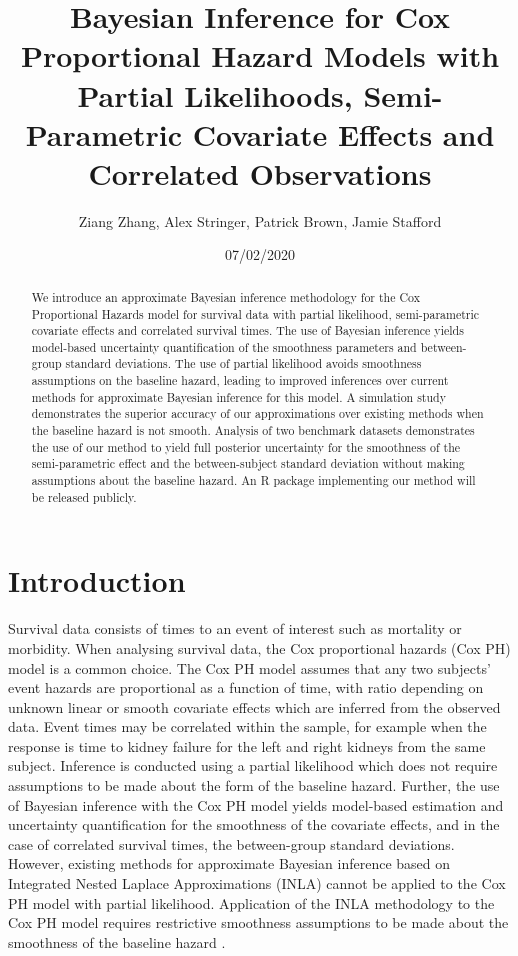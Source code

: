 \documentclass[]{article}
\title{{\myfont Bayesian Inference for Cox Proportional Hazard Models with Partial Likelihoods, Semi-Parametric Covariate Effects and Correlated Observations}}
\date{07/02/2020}
\author{Ziang Zhang, Alex Stringer, Patrick Brown, Jamie Stafford}
\begin{document}
	
\maketitle

\begin{abstract}
We introduce an approximate Bayesian inference methodology for the Cox Proportional Hazards model for survival data with partial likelihood, semi-parametric covariate effects and correlated survival times. The use of Bayesian inference yields model-based uncertainty quantification of the smoothness parameters and between-group standard deviations. The use of partial likelihood avoids smoothness assumptions on the baseline hazard, leading to improved inferences over current methods for approximate Bayesian inference for this model. A simulation study demonstrates the superior accuracy of our approximations over existing methods when the baseline hazard is not smooth. Analysis of two benchmark datasets demonstrates the use of our method to yield full posterior uncertainty for the smoothness of the semi-parametric effect and the between-subject standard deviation without making assumptions about the baseline hazard. An R package implementing our method will be released publicly.
\end{abstract}


\section{Introduction}
Survival data consists of times to an event of interest such as mortality or morbidity.  When analysing survival data, the Cox proportional hazards (Cox PH) model is a common choice. The Cox PH model assumes that any two subjects' event hazards are proportional as a function of time, with ratio depending on unknown linear or smooth covariate effects which are inferred from the observed data. Event times may be correlated within the sample, for example when the response is time to kidney failure for the left and right kidneys from the same subject. Inference is conducted using a partial likelihood which does not require assumptions to be made about the form of the baseline hazard.  Further, the use of Bayesian inference with the Cox PH model yields model-based estimation and uncertainty quantification for the smoothness of the covariate effects, and in the case of correlated survival times, the between-group standard deviations. However, existing methods for approximate Bayesian inference based on Integrated Nested Laplace Approximations (INLA) \citet{inla} cannot be applied to the Cox PH model with partial likelihood. Application of the INLA methodology to the Cox PH model requires restrictive smoothness assumptions to be made about the smoothness of the baseline hazard \citep{inlacoxph}.
\end{document}
